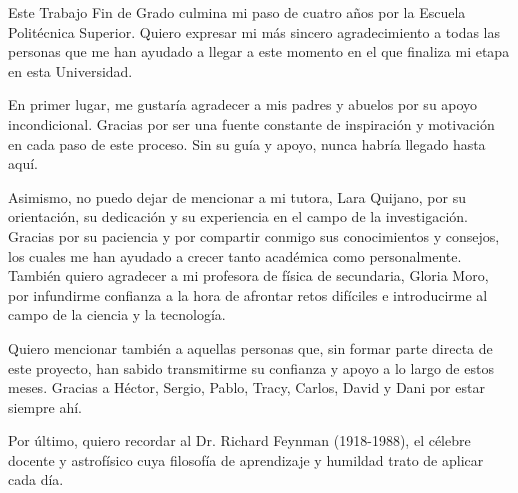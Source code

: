 Este Trabajo Fin de Grado culmina mi paso de cuatro años por la Escuela Politécnica Superior. Quiero expresar mi más sincero agradecimiento a todas las personas que me han ayudado a llegar a este momento en el que finaliza mi etapa en esta Universidad.

En primer lugar, me gustaría agradecer a mis padres y abuelos por su apoyo incondicional. Gracias por ser una fuente constante de inspiración y motivación en cada paso de este proceso. Sin su guía y apoyo, nunca habría llegado hasta aquí.

Asimismo, no puedo dejar de mencionar a mi tutora, Lara Quijano, por su orientación, su dedicación y su experiencia en el campo de la investigación. Gracias por su paciencia y por compartir conmigo sus conocimientos y consejos, los cuales me han ayudado a crecer tanto académica como personalmente. También quiero agradecer a mi profesora de física de secundaria, Gloria Moro, por infundirme confianza a la hora de afrontar retos difíciles e introducirme al campo de la ciencia y la tecnología.

Quiero mencionar también a aquellas personas que, sin formar parte directa de este proyecto, han sabido transmitirme su confianza y apoyo a lo largo de estos meses. Gracias a Héctor, Sergio, Pablo, Tracy, Carlos, David y Dani por estar siempre ahí.

Por último, quiero recordar al Dr. Richard Feynman (1918-1988), el célebre docente y astrofísico cuya filosofía de aprendizaje y humildad trato de aplicar cada día.